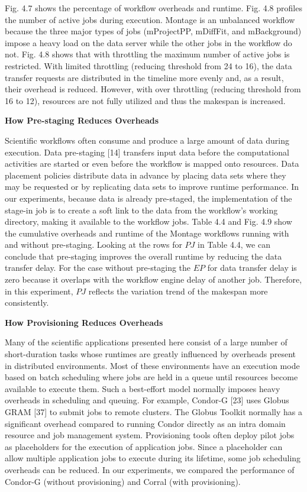 Fig. 4.7 shows the percentage of workflow overheads and runtime. Fig. 4.8 profiles the number of active jobs during execution. Montage is an unbalanced workflow because the three major types of jobs (mProjectPP, mDiffFit, and mBackground) impose a heavy load on the data server while the other jobs in the workflow do not. Fig. 4.8 shows that with throttling the maximum number of active jobs is restricted. With limited throttling (reducing threshold from 24 to 16), the data transfer requests are distributed in the timeline more evenly and, as a result, their overhead is reduced. However, with over throttling (reducing threshold from 16 to 12), resources are not fully utilized and thus the makespan is increased. 

\textbf{How Pre-staging Reduces Overheads}

Scientific workflows often consume and produce a large amount of data during execution. Data pre-staging [14] transfers input data before the computational activities are started or even before the workflow is mapped onto resources. Data placement policies distribute data in advance by placing data sets where they may be requested or by replicating data sets to improve runtime performance. In our experiments, because data is already pre-staged, the implementation of the stage-in job is to create a soft link to the data from the workflow’s working directory, making it available to the workflow jobs. Table 4.4 and Fig. 4.9 show the cumulative overheads and runtime of the Montage workflows running with and without pre-staging. Looking at the rows for $PJ$ in Table 4.4, we can conclude that pre-staging improves the overall runtime by reducing the data transfer delay. For the case without pre-staging the $EP$ for data transfer delay is zero because it overlaps with the workflow engine delay of another job. Therefore, in this experiment, $PJ$ reflects the variation trend of the makespan more consistently. 

\textbf{How Provisioning Reduces Overheads}

Many of the scientific applications presented here consist of a large number of short-duration tasks whose runtimes are greatly influenced by overheads present in distributed environments. Most of these environments have an execution mode based on batch scheduling where jobs are held in a queue until resources become available to execute them. Such a best-effort model normally imposes heavy overheads in scheduling and queuing. For example, Condor-G [23] uses Globus GRAM [37] to submit jobs to remote clusters. The Globus Toolkit normally has a significant overhead compared to running Condor directly as an intra domain resource and job management system. Provisioning tools often deploy pilot jobs as placeholders for the execution of application jobs. Since a placeholder can allow multiple application jobs to execute during its lifetime, some job scheduling overheads can be reduced. In our experiments, we compared the performance of Condor-G (without provisioning) and Corral (with provisioning). 

